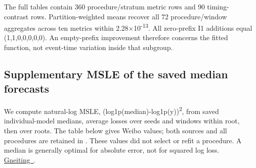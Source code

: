 The full tables contain 360 procedure/stratum metric rows and 90 timing-contrast rows. Partition-weighted means recover all 72 procedure/window aggregates across ten metrics within 2.28\ensuremath{\times}10\textsuperscript{-13}. All zero-prefix I1 additions equal (1,1,0,0,0,0,0). An empty-prefix improvement therefore concerns the fitted function, not event-time variation inside that subgroup.

\hypertarget{supplementary-msle-of-the-saved-median-forecasts}{%
\subsection{Supplementary MSLE of the saved median forecasts}\label{supplementary-msle-of-the-saved-median-forecasts}}

We compute natural-log MSLE, (log1p(median)-log1p(y))\textsuperscript{2}, from saved individual-model medians, average losses over seeds and windows within root, then over roots. The table below gives Weibo values; both sources and all procedures are retained in . These values did not select or refit a procedure. A median is generally optimal for absolute error, not for squared log loss. \href{https://arxiv.org/abs/0912.0902}{Gneiting~\cite{gneiting2011}}.

